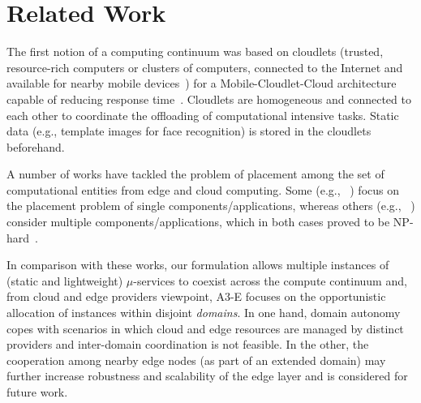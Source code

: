 \section{Related Work}
\label{sec:related}

The first notion of a computing continuum was based on cloudlets (trusted, resource-rich computers or clusters of computers, connected to the Internet and available for nearby mobile devices~\cite{Satyanarayanan:2009}) for a Mobile-Cloudlet-Cloud architecture capable of reducing response time~\cite{Soyata:2012}. Cloudlets are homogeneous and connected to each other to coordinate the offloading of computational intensive tasks. Static data (e.g., template images for face recognition) is stored in the cloudlets beforehand. 


A number of works have tackled the problem of placement among the set of computational entities from edge and cloud computing. Some (e.g., ~\cite{Tarneberg2017}) focus on the placement problem of single components/applications, whereas others (e.g., ~\cite{Wang:2017,Yu18infocom}) consider multiple components/applications, which in both cases proved to be NP-hard~\cite{Yu18infocom}. 



In comparison with these works, our formulation allows multiple instances of (static and lightweight) $\mu$-services to coexist across the compute continuum and, from cloud and edge providers viewpoint, A3-E focuses on the opportunistic allocation of instances within disjoint \textit{domains}. In one hand, domain autonomy copes with scenarios in which cloud and edge resources are managed by distinct providers and inter-domain coordination is not feasible. In the other, the cooperation among nearby edge nodes (as part of an extended domain) may further increase robustness and scalability of the edge layer and is considered for future work.

